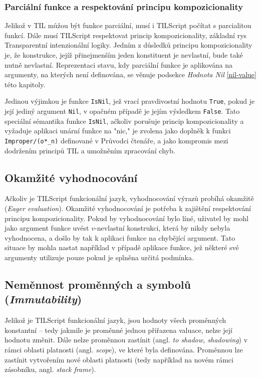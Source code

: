 \subsubsection{Parciální funkce a respektování principu kompozicionality}

Jelikož v TIL můžou být funkce parciální, musí i TILScript počítat s parcialitou funkcí. Dále musí
TILScript respektovat princip kompozicionality, základní rys Transparentní intenzionální logiky.
Jedním z důsledků principu kompozicionality je, že konstrukce, jejíž přinejmenším jeden konstituent
je nevlastní, bude také nutně nevlastní. Reprezentaci stavu, kdy parciální funkce je aplikována
na argumenty, na kterých není definována, se věnuje podsekce \textit{Hodnota Nil} \ref{nil-value}
této kapitoly. 

Jedinou výjimkou je funkce \lstinline{IsNil}, jež vrací pravdivostní hodnotu \lstinline{True},
pokud je její jediný argument \lstinline{Nil}, v opačném případě je jejím výsledkem
\lstinline{False}. Tato speciální sémantika funkce \lstinline{IsNil}, ačkoliv porušuje princip
kompozicionality a vyžaduje aplikaci unární funkce na "nic," je zvolena jako doplněk k funkci
\lstinline{Improper/(o*_n)} definované v Průvodci čtenáře, a jako kompromis mezi dodržením
principů TIL a umožněním zpracování chyb.

\subsection{Okamžité vyhodnocování}

Ačkoliv je TILScript funkcionální jazyk, vyhodnocování výrazů probíhá okamžitě
(\textit{Eager evaluation}). Okamžité vyhodnocování je potřeba k zajištění respektování principu
kompozicionality. Pokud by vyhodnocování bylo líné, uživatel by mohl jako argument funkce uvést
$v$-nevlastní konstrukci, která by nikdy nebyla vyhodnocena, a došlo by tak k aplikaci funkce
na chybějící argument. Tato situace by mohla nastat například v případě aplikace funkce, jež 
některé své argumenty utilizuje pouze pokud je splněna určitá podmínka.

\subsection{Neměnnost proměnných a symbolů (\textit{Immutability})}

Jelikož je TILScript funkcionální jazyk, jsou hodnoty všech proměnných konstantní -- tedy
jakmile je proměnné jednou přiřazena valuace, nelze její hodnotu změnit. Dále nelze proměnnou
zastínit (angl. \textit{to shadow, shadowing}) v rámci oblasti platnosti (angl. \textit{scope}),
ve které byla definována. Proměnnou lze zastínit vytvořením nové oblasti platnosti (tedy například
na novém rámci zásobníku, angl. \textit{stack frame}).

